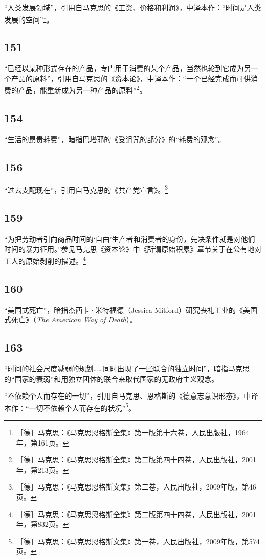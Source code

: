 \documentclass[fontset=fandol, a4paper, 12pt, openright]{ctexbook}
\begin{document}
“人类发展领域”，引用自马克思的《工资、价格和利润》，中译本作：“时间是人类发展的空间”\footnote{［德］马克思：《马克思恩格斯全集》第一版第十六卷，人民出版社，1964年，第161页。}。

\subsection*{151}
“已经以某种形式存在的产品，专门用于消费的某个产品，当然也轮到它成为另一个产品的原料”，引用自马克思的《资本论》，中译本作：“一个已经完成而可供消费的产品，能重新成为另一种产品的原料”\footnote{［德］马克思：《马克思恩格斯全集》第二版第四十四卷，人民出版社，2001年，第213页。}。

\subsection*{154}
“生活的昂贵耗费”，暗指巴塔耶的《受诅咒的部分》的“耗费的观念”。

\subsection*{156}
“过去支配现在”，引用自马克思的《共产党宣言》。\footnote{［德］马克思：《马克思恩格斯文集》第二卷，人民出版社，2009年版，第46页。}

\subsection*{159}
“为把劳动者引向商品时间的‘自由’生产者和消费者的身份，先决条件就是对他们时间的暴力征用。”参见马克思《资本论》中《所谓原始积累》章节关于在公有地对工人的原始剥削的描述。\footnote{［德］马克思：《马克思恩格斯全集》第二版第四十四卷，人民出版社，2001年，第832页。}

\subsection*{160}
“美国式死亡”，暗指杰西卡·米特福德（Jessica Mitford）研究丧礼工业的《美国式死亡》（\textit{The American Way of Death}）。

\subsection*{163}
“时间的社会尺度减弱的规划……同时出现了一些联合的独立时间”，暗指马克思的“国家的衰弱”和用独立团体的联合来取代国家的无政府主义观念。

“不依赖个人而存在的一切”，引用自马克思、恩格斯的《德意志意识形态》，中译本作：“一切不依赖个人而存在的状况”\footnote{［德］马克思：《马克思恩格斯文集》第一卷，人民出版社，2009年版，第574页。}。
\end{document}
